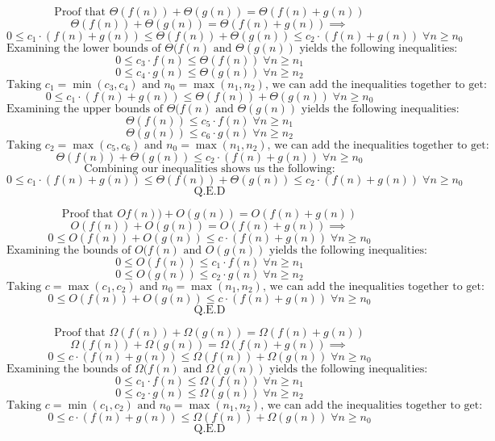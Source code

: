 \documentclass{article}
\begin{document}
$$\text{Proof that } \Theta(f(n)) + \Theta(g(n)) = \Theta(f(n) + g(n))$$
$$\Theta(f(n)) + \Theta(g(n)) = \Theta(f(n) + g(n)) \implies$$
$$0 \le c_1 \cdot (f(n) + g(n)) \le \Theta(f(n)) + \Theta(g(n)) \le c_2 \cdot (f(n) + g(n)) \; \forall n \ge n_0$$
$$\text{Examining the lower bounds of } \Theta(f(n) \text{ and } \Theta(g(n)) \text{ yields the following inequalities:}$$
$$0 \le c_3 \cdot f(n) \le \Theta(f(n)) \; \forall n \ge n_1$$
$$0 \le c_4 \cdot g(n) \le \Theta(g(n)) \; \forall n \ge n_2$$
$$\text{Taking } c_1 = \min(c_3 , c_4) \text{ and } n_0 = \max(n_1 , n_2) \text{, we can add the inequalities together to get:}$$
$$0 \le c_1 \cdot (f(n) + g(n)) \le \Theta(f(n)) + \Theta(g(n)) \; \forall n \ge n_0$$
$$\text{Examining the upper bounds of } \Theta(f(n) \text{ and } \Theta(g(n)) \text{ yields the following inequalities:}$$
$$\Theta(f(n)) \le c_5 \cdot f(n)  \; \forall n \ge n_1$$
$$\Theta(g(n)) \le c_6 \cdot g(n)  \; \forall n \ge n_2$$
$$\text{Taking } c_2 = \max(c_5 , c_6) \text{ and } n_0 = \max(n_1 , n_2) \text{, we can add the inequalities together to get:}$$
$$ \Theta(f(n)) + \Theta(g(n)) \le  c_2 \cdot (f(n) + g(n)) \; \forall n \ge n_0$$
$$\text{Combining our inequalities shows us the following:}$$
$$ 0 \le c_1 \cdot (f(n) + g(n)) \le \Theta(f(n)) + \Theta(g(n)) \le  c_2 \cdot (f(n) + g(n)) \; \forall n \ge n_0$$
$$\text{Q.E.D}$$

$$\text{Proof that } Of(n)) + O(g(n)) = O(f(n) + g(n))$$
$$O(f(n)) + O(g(n)) = O(f(n) + g(n)) \implies$$
$$0 \le O(f(n)) + O(g(n)) \le c \cdot (f(n) + g(n)) \; \forall n \ge n_0$$
$$\text{Examining the bounds of } O(f(n) \text{ and } O(g(n)) \text{ yields the following inequalities:}$$
$$0 \le O(f(n)) \le c_1 \cdot f(n)  \; \forall n \ge n_1$$
$$0 \le O(g(n)) \le c_2 \cdot g(n)  \; \forall n \ge n_2$$
$$\text{Taking } c = \max(c_1 , c_2) \text{ and } n_0 = \max(n_1 , n_2) \text{, we can add the inequalities together to get:}$$
$$0 \le O(f(n)) + O(g(n)) \le c \cdot (f(n) + g(n)) \; \forall n \ge n_0$$
$$\text{Q.E.D}$$

$$\text{Proof that } \Omega(f(n)) + \Omega(g(n)) = \Omega(f(n) + g(n))$$
$$\Omega(f(n)) + \Omega(g(n)) = \Omega(f(n) + g(n)) \implies$$
$$0 \le c \cdot (f(n) + g(n)) \le \Omega(f(n)) + \Omega(g(n)) \; \forall n \ge n_0$$
$$\text{Examining the bounds of } \Omega(f(n) \text{ and } \Omega(g(n)) \text{ yields the following inequalities:}$$
$$0 \le c_1 \cdot f(n) \le \Omega(f(n))  \; \forall n \ge n_1$$
$$0 \le c_2 \cdot g(n) \le \Omega(g(n)) \; \forall n \ge n_2$$
$$\text{Taking } c = \min(c_1 , c_2) \text{ and } n_0 = \max(n_1 , n_2) \text{, we can add the inequalities together to get:}$$
$$0 \le c \cdot (f(n) + g(n)) \le \Omega(f(n)) + \Omega(g(n))  \; \forall n \ge n_0$$
$$\text{Q.E.D}$$
\end{document}
